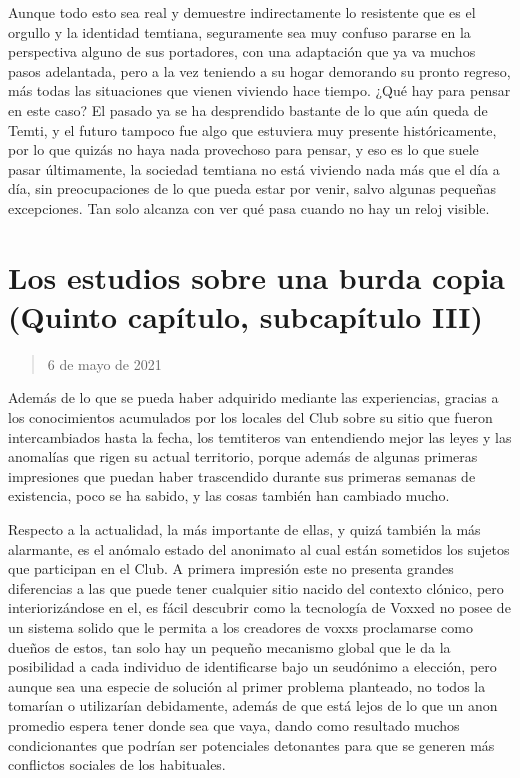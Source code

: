 \documentclass[
  spanish,
]{book}
\begin{document}
Aunque todo esto sea real y demuestre indirectamente lo resistente que es el orgullo y la identidad temtiana, seguramente sea muy confuso pararse en la perspectiva alguno de sus portadores, con una adaptación que ya va muchos pasos adelantada, pero a la vez teniendo a su hogar demorando su pronto regreso, más todas las situaciones que vienen viviendo hace tiempo.
¿Qué hay para pensar en este caso?
El pasado ya se ha desprendido bastante de lo que aún queda de Temti, y el futuro tampoco fue algo que estuviera muy presente históricamente, por lo que quizás no haya nada provechoso para pensar, y eso es lo que suele pasar últimamente, la sociedad temtiana no está viviendo nada más que el día a día, sin preocupaciones de lo que pueda estar por venir, salvo algunas pequeñas excepciones. Tan solo alcanza con ver qué pasa cuando no hay un reloj visible.

\hypertarget{los-estudios-sobre-una-burda-copia-quinto-capuxedtulo-subcapuxedtulo-iii}{%
\section{Los estudios sobre una burda copia (Quinto capítulo, subcapítulo III)}\label{los-estudios-sobre-una-burda-copia-quinto-capuxedtulo-subcapuxedtulo-iii}}

\begin{quote}
6 de mayo de 2021
\end{quote}

Además de lo que se pueda haber adquirido mediante las experiencias, gracias a los conocimientos acumulados por los locales del Club sobre su sitio que fueron intercambiados hasta la fecha, los temtiteros van entendiendo mejor las leyes y las anomalías que rigen su actual territorio, porque además de algunas primeras impresiones que puedan haber trascendido durante sus primeras semanas de existencia, poco se ha sabido, y las cosas también han cambiado mucho.

Respecto a la actualidad, la más importante de ellas, y quizá también la más alarmante, es el anómalo estado del anonimato al cual están sometidos los sujetos que participan en el Club. A primera impresión este no presenta grandes diferencias a las que puede tener cualquier sitio nacido del contexto clónico, pero interiorizándose en el, es fácil descubrir como la tecnología de Voxxed no posee de un sistema solido que le permita a los creadores de voxxs proclamarse como dueños de estos, tan solo hay un pequeño mecanismo global que le da la posibilidad a cada individuo de identificarse bajo un seudónimo a elección, pero aunque sea una especie de solución al primer problema planteado, no todos la tomarían o utilizarían debidamente, además de que está lejos de lo que un anon promedio espera tener donde sea que vaya, dando como resultado muchos condicionantes que podrían ser potenciales detonantes para que se generen más conflictos sociales de los habituales.
\end{document}
